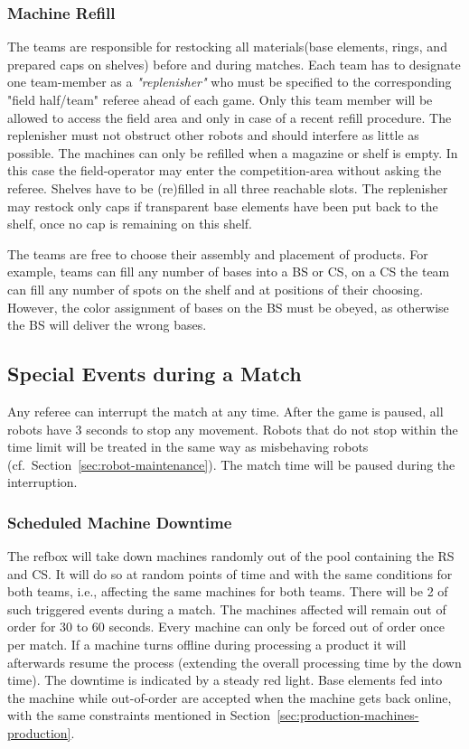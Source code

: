 \documentclass[12pt,twoside]{article}
\newcommand{\refsec}[1]{Section~\ref{#1}}
\begin{document}
\subsubsection{Machine Refill}
\label{sec:machine-refill}
The teams are responsible for restocking all materials(base elements,
rings, and prepared caps on shelves) before and during matches. Each
team has to designate one team-member as a \textit{"replenisher"} who
must be specified to the corresponding "field half/team" referee ahead
of each game.  Only this team member will be allowed to access the
field area and only in case of a recent refill procedure.  The
replenisher must not obstruct other robots and should interfere as
little as possible.  The machines can only be refilled when a magazine
or shelf is empty. In this case the field-operator may enter the
competition-area without asking the referee. Shelves have to be
(re)filled in all three reachable
slots. The replenisher may restock only caps if transparent base elements
have been put back to the shelf, once no cap is remaining on this shelf.

The teams are free to choose their assembly and placement of
products. For example, teams can fill any number of bases into a BS or
CS, on a CS the team can fill any number of spots on the shelf and at
positions of their choosing. However, the color assignment of bases on
the BS must be obeyed, as otherwise the BS will deliver the wrong
bases.

\subsection{Special Events during a Match}
\label{sec:during-match}
Any referee can interrupt the match at any time. After the game is
paused, all robots have 3 seconds to stop any movement.  Robots that
do not stop within the time limit will be treated in the same way as
misbehaving robots (cf.~\refsec{sec:robot-maintenance}).  The match
time will be paused during the interruption.

\subsubsection{Scheduled Machine Downtime}
\label{sec:out-of-order}
The refbox will take down machines randomly out of the pool containing
the RS and CS. It will do so at random points of time and with the
same conditions for both teams, i.e., affecting the same machines for
both teams. There will be 2 of such triggered events during a
match. The machines affected will remain out of order for 30 to 60
seconds. Every machine can only be forced out of order once per
match. If a machine turns offline during processing a product it will
afterwards resume the process (extending the overall processing time
by the down time). The downtime is indicated by a steady red
light. Base elements fed into the machine while out-of-order are
accepted when the machine gets back online, with the same constraints
mentioned in \refsec{sec:production-machines-production}.
\end{document}
